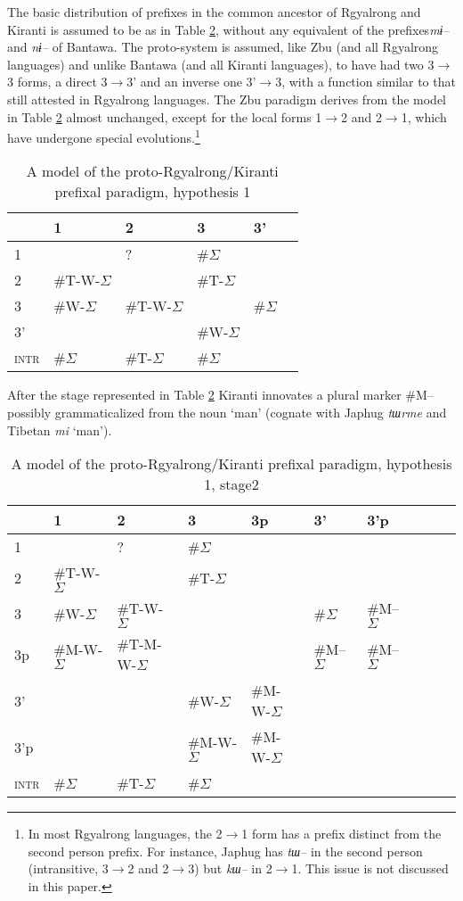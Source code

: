 \documentclass[twoside,a4paper,11pt]{article}
\newcommand{\ipa}[1]{{\phon\textit{#1}}}
\newcommand{\grise}[1]{\cellcolor{lightgray}\textbf{#1}}
\newcommand{\Σ}{\greek{Σ}}
\newcommand{\ro}{$\Sigma$}
\begin{document}
The basic distribution of prefixes in the common ancestor of Rgyalrong and Kiranti is assumed to be as in Table \ref{tab:proto.st1}, without any equivalent of the prefixes\ipa{mɨ--} and \ipa{nɨ--} of Bantawa. The proto-system is assumed, like Zbu (and all Rgyalrong languages) and unlike Bantawa (and all Kiranti languages), to have had two 3$\rightarrow$3 forms, a direct 3$\rightarrow$3' and an inverse one 3'$\rightarrow$3, with a function similar to that still attested in   Rgyalrong languages. The Zbu paradigm derives from the model in Table \ref{tab:proto.st1} almost unchanged, except for the local forms 1$\rightarrow$2 and 2$\rightarrow$1, which have undergone special evolutions.\footnote{In most Rgyalrong languages, the 2$\rightarrow$1 form has a  prefix distinct from the second person prefix. For instance, Japhug has   \ipa{tɯ--} in the second person (intransitive, 3$\rightarrow$2 and 2$\rightarrow$3) but \ipa{kɯ--} in 2$\rightarrow$1. This issue is not discussed in this paper.}


\begin{table}[H] 
\caption{A model of the proto-Rgyalrong/Kiranti prefixal paradigm, hypothesis 1} 
 \centering \label{tab:proto.st1}
\begin{tabular}{l|lllll} 
\toprule
&1 & 2 &3 & 3'\\
\hline
1 &\grise{} & ? &  \#\ro{} \\
2&\#T-W-\ro{} & \grise{} &\#T-\ro{}\\
3&\#W-\ro{} &\#T-W-\ro{} & \grise{} &\#\ro{} \\
3'&&&\#W-\ro{} \\
\hline
\textsc{intr}&\#\ro{}&\#T-\ro{}&\#\ro{}\\
\bottomrule
\end{tabular}
\end{table}
After the stage represented in Table \ref{tab:proto.st1} Kiranti innovates a plural marker \#M-- possibly grammaticalized from the noun `man' (cognate with Japhug \ipa{tɯrme} and Tibetan \ipa{mi} `man'). 

\begin{table}[H] 
\caption{A model of the proto-Rgyalrong/Kiranti prefixal paradigm, hypothesis 1, stage2} 
 \centering \label{tab:proto.st1}
\begin{tabular}{l|lllllllll} 
\toprule
&1 & 2 &3 & 3p & 3' & 3'p \\
\hline
1 &\grise{} & ? &  \#\ro{} \\
2&\#T-W-\ro{} & \grise{} &\#T-\ro{}\\
3&\#W-\ro{} &\#T-W-\ro{} & \grise{} &\grise{} &\#\ro{} &\#M--\ro{}\\
3p&\#M-W-\ro{} &\#T-M-W-\ro{} & \grise{} &\grise{} &\#M--\ro{} &\#M--\ro{}\\
3'&&&\#W-\ro{}&\#M-W-\ro{} \\
3'p&&&\#M-W-\ro{} &\#M-W-\ro{} \\
\hline
\textsc{intr}&\#\ro{}&\#T-\ro{}&\#\ro{}\\
\bottomrule
\end{tabular}
\end{table}
\end{document}
